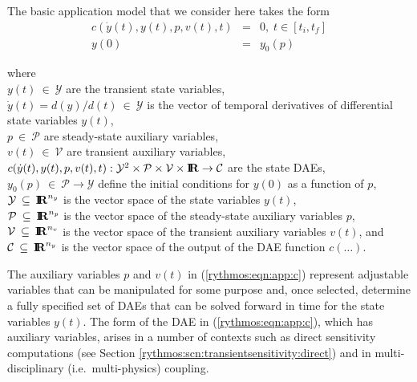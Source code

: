 \documentclass[pdf,ps2pdf,11pt]{SANDreport}
\begin{document}
The basic application model that we consider here takes the form
%
\begin{eqnarray}
c\left( \dot{y}(t), y(t), p, v(t), t \right) & = & 0,
\; t \in \left[ t_i, t_f \right] \label{rythmos:eqn:app:c} \\
y(0) & = & y_0(p) \label{rythmos:eqn:app:c:ic}
\end{eqnarray}
\begin{tabbing}
\hspace{4ex}where\hspace{1ex}\= \\
\>	$y(t) \:\in\:\mathcal{Y}$ are the transient state variables, \\
\>	$\dot{y}(t) = d(y)/d(t)\:\in\:\mathcal{Y}$ is the vector of temporal derivatives of differential state variables $y(t)$, \\
\>	$p \:\in\:\mathcal{P}$ are steady-state auxiliary variables, \\
\>	$v(t) \:\in\:\mathcal{V}$ are transient auxiliary variables, \\
\>	$c(\dot{y}(t), y(t), p, v(t), t) :
		\mathcal{Y}^2 \times \mathcal{P} \times \mathcal{V} \times \mbox{\textbf{I}}\hspace{-0.6ex}\mbox{\textbf{R}}
		\rightarrow \mathcal{C}$ are the state DAEs, \\
\>	$y_0(p) \:\in\:\mathcal{P} \rightarrow \mathcal{Y}$ define the initial conditions for $y(0)$ as a function of $p$, \\
\>	$\mathcal{Y} \:\subseteq\:\mbox{\textbf{I}}\hspace{-0.6ex}\mbox{\textbf{R}}^{n_y}$ is the vector space of the state variables $y(t)$, \\
\>	$\mathcal{P} \:\subseteq\:\mbox{\textbf{I}}\hspace{-0.6ex}\mbox{\textbf{R}}^{n_p}$ is the vector space of the steady-state auxiliary variables $p$, \\
\>	$\mathcal{V} \:\subseteq\:\mbox{\textbf{I}}\hspace{-0.6ex}\mbox{\textbf{R}}^{n_v}$ is the vector space of the transient auxiliary variables $v(t)$, and \\
\>	$\mathcal{C} \:\subseteq\:\mbox{\textbf{I}}\hspace{-0.6ex}\mbox{\textbf{R}}^{n_y}$ is the vector space of the output of the DAE function $c(\ldots)$.
\end{tabbing}

The auxiliary variables $p$ and $v(t)$ in (\ref{rythmos:eqn:app:c}) represent
adjustable variables that can be manipulated for some purpose and, once
selected, determine a fully specified set of DAEs that can be solved forward
in time for the state variables $y(t)$.  The form of the DAE in
(\ref{rythmos:eqn:app:c}), which has auxiliary variables, arises in a number
of contexts such as direct sensitivity computations (see Section \ref{rythmos:scn:transientsensitivity:direct}) and in
multi-disciplinary (i.e.\ multi-physics) coupling.
\end{document}
